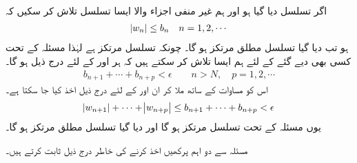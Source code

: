 \quad {}\\
اگر تسلسل  دیا گیا ہو اور ہم غیر منفی اجزاء والا ایسا تسلسل  تلاش کر سکیں کہ
\begin{align}\label{مساوات_ترتیب_جانچ_مقابلہ_الف}
\abs{w_n}\le b_n\quad n=1,2,\cdots
\end{align}
ہو تب دیا گیا تسلسل مطلق مرتکز ہو گا۔
\quad
چونکہ تسلسل  مرتکز ہے  لہٰذا مسئلہ  کے تحت کسی بھی دیے گئے  کے لئے ہم ایسا  تلاش کر سکتے ہیں کہ ہر  اور  کے لئے درج ذیل ہو گا۔
\begin{align*}
b_{n+1}+\cdots+b_{n+p}<\epsilon \quad \quad n>N,\quad p=1,2,\cdots
\end{align*}
اس کو مساوات  کے ساتھ ملا کر ان  اور  کے لئے درج ذیل اخذ کیا جا سکتا ہے۔
\begin{align*}
\abs{w_{n+1}}+\cdots+\abs{w_{n+p}}\le b_{n+1}+\cdots+b_{n+p}<\epsilon
\end{align*}
یوں مسئلہ  کے تحت تسلسل  مرتکز ہو گا اور دیا گیا تسلسل مطلق مرتکز ہو گا۔

مسئلہ  سے دو اہم پرکھیں  اخذ کرنے کی خاطر درج ذیل ثابت کرتے ہیں۔

